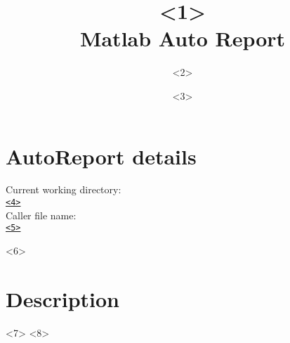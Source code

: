 \documentclass{report}
\title{<1>\\ Matlab Auto Report}
\author{<2>}
\date{<3>}
\begin{document}
\maketitle
\listoffigures

\section*{AutoReport details}
Current working directory:\\
\texttt{\url{<4>}} \\

\noindent Caller file name:\\
\texttt{\url{<5>}}

<6> 
\section*{Description}
<7> 
<8> 
\end{document}
